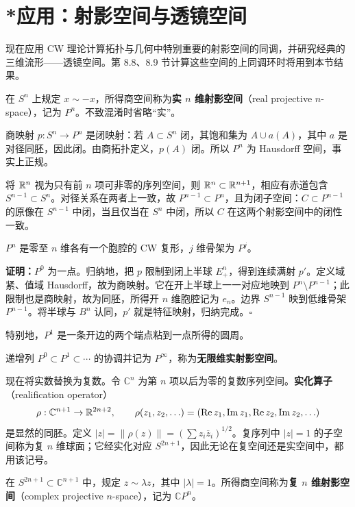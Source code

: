 \section{*应用：射影空间与透镜空间}
现在应用 CW 理论计算拓扑与几何中特别重要的射影空间的同调，并研究经典的三维流形——透镜空间。第 8.8、8.9 节计算这些空间的上同调环时将用到本节结果。

在 $S^n$ 上规定 $x\sim-x$，所得商空间称为\textbf{实 $n$ 维射影空间}（real projective $n$-space），记为 $P^n$。不致混淆时省略“实”。

商映射 $p:S^n\to P^n$ 是闭映射：若 $A\subset S^n$ 闭，其饱和集为 $A\cup a(A)$，其中 $a$ 是对径同胚，因此闭。由商拓扑定义，$p(A)$ 闭。所以 $P^n$ 为 Hausdorff 空间，事实上正规。

将 $\mathbb{R}^n$ 视为只有前 $n$ 项可非零的序列空间，则 $\mathbb{R}^n\subset\mathbb{R}^{n+1}$，相应有赤道包含 $S^{n-1}\subset S^n$。对径关系在两者上一致，故 $P^{n-1}\subset P^n$，且为闭子空间：$C\subset P^{n-1}$ 的原像在 $S^{n-1}$ 中闭，当且仅当在 $S^n$ 中闭，所以 $C$ 在这两个射影空间中的闭性一致。

$P^n$ 是零至 $n$ 维各有一个胞腔的 CW 复形，$j$ 维骨架为 $P^j$。

\textbf{证明：}$P^0$ 为一点。归纳地，把 $p$ 限制到闭上半球 $E^n_+$，得到连续满射 $p'$。定义域紧、值域 Hausdorff，故为商映射。它在开上半球上一一对应地映到 $P^n\setminus P^{n-1}$；此限制也是商映射，故为同胚，所得开 $n$ 维胞腔记为 $e_n$。边界 $S^{n-1}$ 映到低维骨架 $P^{n-1}$。将半球与 $B^n$ 认同，$p'$ 就是特征映射，归纳完成。\hfill$\square$

特别地，$P^1$ 是一条开边的两个端点粘到一点所得的圆周。

递增列 $P^0\subset P^1\subset\cdots$ 的协调并记为 $P^\infty$，称为\textbf{无限维实射影空间}。

现在将实数替换为复数。令 $\mathbb C^n$ 为第 $n$ 项以后为零的复数序列空间。\textbf{实化算子}（realification operator）
\[
\rho:\mathbb C^{n+1}\to\mathbb{R}^{2n+2},\qquad
\rho(z_1,z_2,\ldots)=(\operatorname{Re}z_1,\operatorname{Im}z_1,\operatorname{Re}z_2,\operatorname{Im}z_2,\ldots)
\]
是显然的同胚。定义 $|z|=\|\rho(z)\|=(\sum z_i\overline z_i)^{1/2}$。复序列中 $|z|=1$ 的子空间称为复 $n$ 维球面；它经实化对应 $S^{2n+1}$，因此无论在复空间还是实空间中，都用该记号。

在 $S^{2n+1}\subset\mathbb C^{n+1}$ 中，规定 $z\sim\lambda z$，其中 $|\lambda|=1$。所得商空间称为\textbf{复 $n$ 维射影空间}（complex projective $n$-space），记为 $\mathbb CP^n$。

